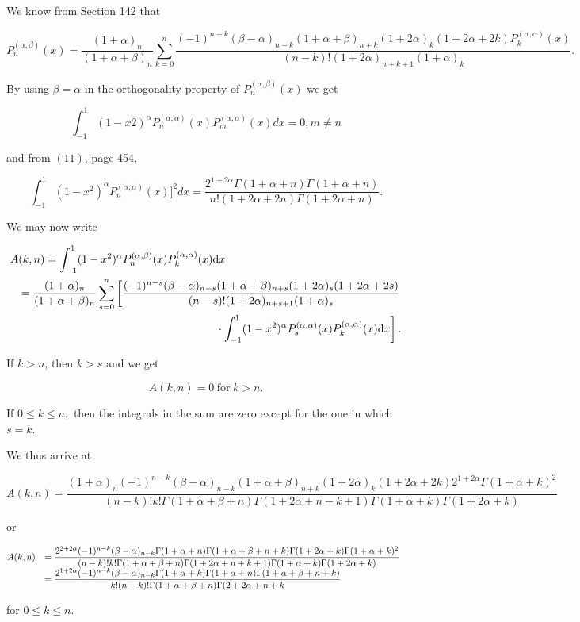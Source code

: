 \begin{solution}
We know from Section 142 that

$$P_n^{(\alpha,\beta)}(x) = \dfrac{(1+\alpha)_n}{(1+\alpha+\beta)_n} \displaystyle\sum_{k=0}^n \dfrac{(-1)^{n-k} (\beta-\alpha)_{n-k} (1+\alpha+\beta)_{n+k} (1+2\alpha)_k (1+2\alpha+2k) P_k^{(\alpha,\alpha)}(x)}{(n-k)! (1+2\alpha)_{n+k+1} (1+\alpha)_k}.$$

By using $\beta=\alpha$ in the orthogonality property of $P_n^{(\alpha,\beta)}(x)$ we get 

$$\displaystyle\int_{-1}^1 (1-x2)^{\alpha} P_n^{(\alpha,\alpha)}(x) P_m^{(\alpha,\alpha)}(x)dx =0, m\neq n$$

and from $(11)$, page 454,

$$\displaystyle\int_{-1}^1 (1-x^2)^{\alpha} P_n^{(\alpha,\alpha)}(x)]^2 dx = \dfrac{2^{1+2\alpha}\Gamma(1+\alpha+n)\Gamma(1+\alpha+n)}{n! (1+2\alpha+2n)\Gamma(1+2\alpha+n)}.$$

We may now write

\begin{eqnarray*}
\lefteqn{A(k,n) = \displaystyle\int_{-1}^1 (1-x^2)^{\alpha}P_n^{(\alpha,\beta)}(x) P_k^{(\alpha,\alpha)}(x) \mathrm{d}x} \\
&&= \dfrac{(1+\alpha)_n}{(1+\alpha+\beta)_n} \displaystyle\sum_{s=0}^n \left[ \dfrac{(-1)^{n-s} (\beta-\alpha)_{n-s} (1+\alpha+\beta)_{n+s} (1+2\alpha)_s (1+2\alpha+2s)}{(n-s)! (1+2\alpha)_{n+s+1} (1+\alpha)_s} \right. \\
&&\left.\phantom{=}\cdot\displaystyle\int_{-1}^1 (1-x^2)^{\alpha} P_s^{(\alpha,\alpha)}(x) P_k^{(\alpha,\alpha)}(x) \mathrm{d}x \right].
\end{eqnarray*}

If $k>n$, then $k>s$ and we get

$$A(k,n)=0 \mathrm{\hspace{3pt} for \hspace{3pt}} k>n.$$

If $0 \leq k \leq n,$ then the integrals in the sum are zero except for the one in which $s=k$. 

We thus arrive at

$$A(k,n) = \frac{(1+\alpha)_n (-1)^{n-k} (\beta - \alpha)_{n-k} (1+\alpha+\beta)_{n+k} (1+2\alpha)_k (1 + 2 \alpha+2k) 2^{1+2\alpha} \Gamma(1+\alpha+k)^2}{(n-k)! k! \Gamma(1+\alpha+\beta+n) \Gamma(1+2\alpha+n-k+1) \Gamma(1+\alpha+k) \Gamma(1+2\alpha+k)}$$

or

$$\hspace{-5pt} \begin{array}{ll}
A(k,n) &= \dfrac{2^{2+2\alpha} (-1)^{n-k} (\beta - \alpha)_{n-k} \Gamma(1+\alpha+n) \Gamma(1+\alpha+\beta+n+k) \Gamma(1+2\alpha+k) \Gamma(1+\alpha+k)^2}{(n-k)! k! \Gamma(1+\alpha+\beta+n) \Gamma(1+2\alpha+n+k+1) \Gamma(1+\alpha+k) \Gamma(1+2 \alpha+k)} \\
&= \dfrac{2^{1+2\alpha} (-1)^{n-k} (\beta - \alpha)_{n-k} \Gamma(1+\alpha+k) \Gamma(1+\alpha+n) \Gamma(1+\alpha+\beta+n+k)}{k! (n-k)! \Gamma(1+\alpha+\beta+n) \Gamma(2 + 2 \alpha + n + k}
\end{array}$$

for $0 \leq k \leq n$.
\end{solution}
